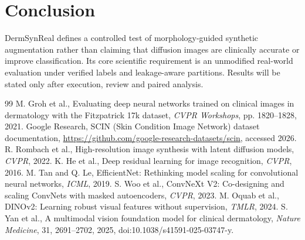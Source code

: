 \documentclass[11pt,a4paper]{article}
\begin{document}
\section{Conclusion}
DermSynReal defines a controlled test of morphology-guided synthetic augmentation rather than claiming that diffusion images are clinically accurate or improve classification. Its core scientific requirement is an unmodified real-world evaluation under verified labels and leakage-aware partitions. Results will be stated only after execution, review and paired analysis.

\begin{thebibliography}{99}\small
{} M. Groh et al., Evaluating deep neural networks trained on clinical images in dermatology with the Fitzpatrick 17k dataset, \emph{CVPR Workshops}, pp. 1820--1828, 2021.
 Google Research, SCIN (Skin Condition Image Network) dataset documentation, \url{https://github.com/google-research-datasets/scin}, accessed 2026.
 R. Rombach et al., High-resolution image synthesis with latent diffusion models, \emph{CVPR}, 2022.
 K. He et al., Deep residual learning for image recognition, \emph{CVPR}, 2016.
 M. Tan and Q. Le, EfficientNet: Rethinking model scaling for convolutional neural networks, \emph{ICML}, 2019.
 S. Woo et al., ConvNeXt V2: Co-designing and scaling ConvNets with masked autoencoders, \emph{CVPR}, 2023.
 M. Oquab et al., DINOv2: Learning robust visual features without supervision, \emph{TMLR}, 2024.
 S. Yan et al., A multimodal vision foundation model for clinical dermatology, \emph{Nature Medicine}, 31, 2691--2702, 2025, doi:10.1038/s41591-025-03747-y.
\end{thebibliography}
\end{document}
